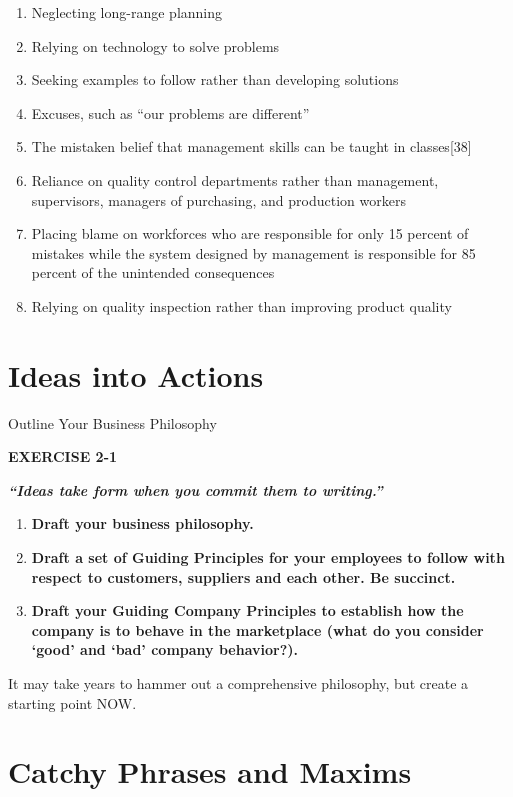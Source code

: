 \documentclass[
]{book}
\begin{document}
\begin{enumerate}
\def\labelenumi{\arabic{enumi}.}
\item
  Neglecting long-range planning
\item
  Relying on technology to solve problems
\item
  Seeking examples to follow rather than developing solutions
\item
  Excuses, such as ``our problems are different''
\item
  The mistaken belief that management skills can be taught in classes{[}38{]}
\item
  Reliance on quality control departments rather than management, supervisors, managers of purchasing, and production workers
\item
  Placing blame on workforces who are responsible for only 15 percent of mistakes while the system designed by management is responsible for 85 percent of the unintended consequences
\item
  Relying on quality inspection rather than improving product quality
\end{enumerate}

\hypertarget{ideas-into-actions-1}{%
\section{Ideas into Actions}\label{ideas-into-actions-1}}

Outline Your Business Philosophy

\textbf{EXERCISE 2-1}

\textbf{\emph{``Ideas take form when you commit them to writing.''}}

\begin{enumerate}
\def\labelenumi{\arabic{enumi}.}
\item
  \textbf{Draft your business philosophy.}
\item
  \textbf{Draft a set of Guiding Principles for your employees to follow with respect to customers, suppliers and each other. Be succinct.}
\item
  \textbf{Draft your Guiding Company Principles to establish how the company is to behave in the marketplace (what do you consider `good' and `bad' company behavior?).}
\end{enumerate}

It may take years to hammer out a comprehensive philosophy, but create a starting point NOW.

\hypertarget{catchy-phrases-and-maxims}{%
\section{Catchy Phrases and Maxims}\label{catchy-phrases-and-maxims}}
\end{document}
